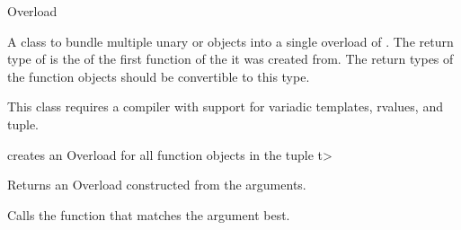 \begin{ccRefClass}{Overload}


\ccDefinition 

A class to bundle multiple unary  or
 objects into a single overload of
. The return type of  is the
 of the first function of the  it was
created from. The return types of the function objects should be
convertible to this type.

This class requires a compiler with support for variadic templates,
rvalues, and tuple.

\ccCreation

              {creates an Overload for all function objects in the tuple t>}

           {Returns an Overload constructed from the arguments.}

\ccOperations

         {Calls the function that matches the argument  best.}



\end{ccRefClass} 
